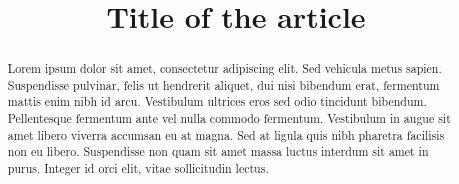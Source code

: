 \documentclass[draft,jgrga]{AGUTeX}
\begin{document}

\title{Title of the article}









\begin{abstract}

Lorem ipsum dolor sit amet, consectetur adipiscing elit. Sed vehicula metus sapien. Suspendisse pulvinar, felis ut hendrerit aliquet, dui nisi bibendum erat, fermentum mattis enim nibh id arcu. Vestibulum ultrices eros sed odio tincidunt bibendum. Pellentesque fermentum ante vel nulla commodo fermentum. Vestibulum in augue sit amet libero viverra accumsan eu at magna. Sed at ligula quis nibh pharetra facilisis non eu libero. Suspendisse non quam sit amet massa luctus interdum sit amet in purus. Integer id orci elit, vitae sollicitudin lectus.

\end{abstract}


\end{document}
